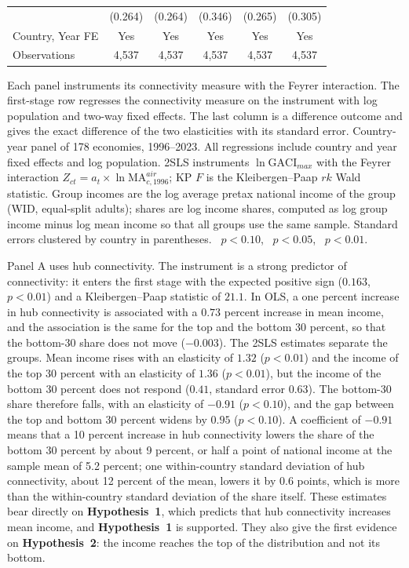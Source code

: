 \begin{table}[H]
\begin{minipage}{\linewidth}
{\begin{tabular}{lccccc}
 & (0.264) & (0.264) & (0.346) & (0.265) & (0.305) \\
\addlinespace
\midrule
Country, Year FE & Yes & Yes & Yes & Yes & Yes \\
Observations & 4{,}537 & 4{,}537 & 4{,}537 & 4{,}537 & 4{,}537 \\
\bottomrule
\end{tabular}}
\par\vspace{3pt}\begin{flushleft}\footnotesize Each panel instruments its connectivity measure with the Feyrer interaction. The first-stage row regresses the connectivity measure on the instrument with log population and two-way fixed effects. The last column is a difference outcome and gives the exact difference of the two elasticities with its standard error. Country-year panel of 178 economies, 1996--2023. All regressions include country and year fixed effects and log population. 2SLS instruments $\ln\mathrm{GACI}_{max}$ with the Feyrer interaction $Z_{ct}=a_t\times\ln\mathrm{MA}^{air}_{c,1996}$; KP $F$ is the Kleibergen--Paap $rk$ Wald statistic. Group incomes are the log average pretax national income of the group (WID, equal-split adults); shares are log income shares, computed as log group income minus log mean income so that all groups use the same sample. Standard errors clustered by country in parentheses. \sym{*}~$p<0.10$, \sym{**}~$p<0.05$, \sym{***}~$p<0.01$.\end{flushleft}
\end{minipage}
\end{table}


Panel A uses hub connectivity. The instrument is a strong predictor of connectivity: it enters the first stage with the expected positive sign ($0.163$, $p<0.01$) and a Kleibergen--Paap statistic of $21.1$. In OLS, a one percent increase in hub connectivity is associated with a $0.73$ percent increase in mean income, and the association is the same for the top and the bottom 30 percent, so that the bottom-30 share does not move ($-0.003$). The 2SLS estimates separate the groups. Mean income rises with an elasticity of $1.32$ ($p<0.01$) and the income of the top 30 percent with an elasticity of $1.36$ ($p<0.01$), but the income of the bottom 30 percent does not respond ($0.41$, standard error $0.63$). The bottom-30 share therefore falls, with an elasticity of $-0.91$ ($p<0.10$), and the gap between the top and bottom 30 percent widens by $0.95$ ($p<0.10$). A coefficient of $-0.91$ means that a 10 percent increase in hub connectivity lowers the share of the bottom 30 percent by about 9 percent, or half a point of national income at the sample mean of 5.2 percent; one within-country standard deviation of hub connectivity, about 12 percent of the mean, lowers it by 0.6 points, which is more than the within-country standard deviation of the share itself. These estimates bear directly on \textbf{Hypothesis~1}, which predicts that hub connectivity increases mean income, and \textbf{Hypothesis~1} is supported. They also give the first evidence on \textbf{Hypothesis~2}: the income reaches the top of the distribution and not its bottom.

